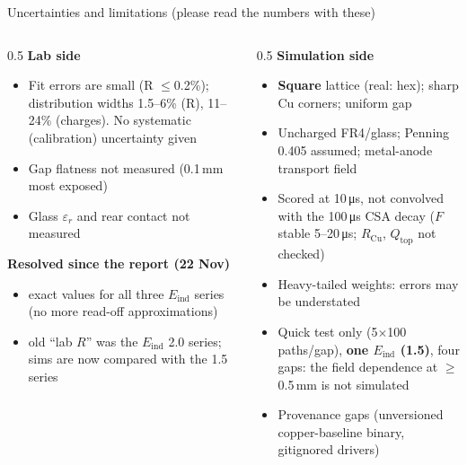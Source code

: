 \documentclass[aspectratio=169,11pt]{beamer}
\newcommand{\bk}[2]{\hyperlink{#1}{\beamergotobutton{#2}}}
\newcommand{\RCu}{R_\text{Cu}}
\newcommand{\Qtop}{Q_\text{top}}
\newcommand{\Eind}{E_\text{ind}}
\newcommand{\er}{\varepsilon_r}
\begin{document}
\begin{frame}[label=m-limits]{Uncertainties and limitations (please read the numbers with these)}
  \footnotesize
  \begin{columns}[T]
    \begin{column}{0.5\textwidth}
      \textbf{Lab side}
      \begin{itemize}
        \item Fit errors are small (R $\le$0.2\%); distribution widths 1.5--6\% (R), 11--24\% (charges). No systematic (calibration) uncertainty given
        \item Gap flatness not measured (0.1\,mm most exposed)
        \item Glass $\er$ and rear contact not measured
      \end{itemize}
      \textbf{Resolved since the report (22 Nov)}
      \begin{itemize}
        \item exact values for all three $\Eind$ series (no more read-off approximations)
        \item old ``lab $R$'' was the $\Eind$ 2.0 series; sims are now compared with the 1.5 series
      \end{itemize}
    \end{column}
    \begin{column}{0.5\textwidth}
      \textbf{Simulation side}
      \begin{itemize}
        \item \textbf{Square} lattice (real: hex); sharp Cu corners; uniform gap
        \item Uncharged FR4/glass; Penning 0.405 assumed; metal-anode transport field
        \item Scored at 10\,\si{\micro s}, not convolved with the 100\,\si{\micro s} CSA decay ($F$ stable 5--20\,\si{\micro s}; $\RCu$, $\Qtop$ not checked)
        \item Heavy-tailed weights: errors may be understated
        \item Quick test only (5$\times$100 paths/gap), \textbf{one $\Eind$ (1.5)}, four gaps: the field dependence at $\ge$0.5\,mm is not simulated
        \item Provenance gaps (unversioned copper-baseline binary, gitignored drivers)
      \end{itemize}
    \end{column}
  \end{columns}
  \bk{b-limits}{B17 details}
\end{frame}
\end{document}
